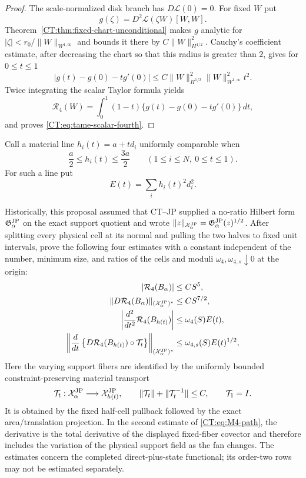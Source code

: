\begin{proof}
The scale-normalized disk branch has $D\mathcal L(0)=0$.  For fixed $W$ put
\[
 g(\zeta)=D^2\mathcal L(\zeta W)[W,W].
\]
Theorem~\ref{CT:thm:fixed-chart-unconditional} makes $g$ analytic for
$|\zeta|<r_0/\|W\|_{W^{1,\infty}}$ and bounds it there by
$C\|W\|_{H^{1/2}}^2$.  Cauchy's coefficient estimate, after decreasing the
chart so that this radius is greater than $2$, gives for $0\le t\le1$
\[
 |g(t)-g(0)-tg'(0)|
 \le C\|W\|_{H^{1/2}}^2\|W\|_{W^{1,\infty}}^2t^2.
\]
Twice integrating the scalar Taylor formula yields
\[
 \mathcal R_4(W)
 =\int_0^1(1-t)\{g(t)-g(0)-tg'(0)\}\,dt,
\]
and proves \eqref{CT:eq:tame-scalar-fourth}.
\end{proof}

Call a material line $h_i(t)=a+td_i$ uniformly comparable when
\begin{equation}\label{CT:eq:uniformly-comparable}
 \frac a2\le h_i(t)\le\frac{3a}{2}
 \qquad(1\le i\le N,\ 0\le t\le1).
\end{equation}
For such a line put
\[
 E(t)=\sum_i h_i(t)^2d_i^2.
\]

\begin{remark}
\label{CT:obl:material-fourth}
Historically, this proposal assumed that CT--JP supplied a no-ratio Hilbert
form $\mathfrak G^{\rm JP}_\alpha$ on the exact support quotient and wrote
$\|z\|_{\mathcal X^{\rm JP}_\alpha}=\mathfrak G^{\rm JP}_\alpha(z)^{1/2}$.  After splitting every physical
cell at its normal and pulling the two halves to fixed unit intervals,
prove the following four estimates with a constant independent of the
number, minimum size, and ratios of the cells and moduli
$\omega_4,\omega_{4,s}\downarrow0$ at the origin:
\begin{align}
 |\mathcal R_4(B_\alpha)|&\le CS^5,\notag\\
 \|D\mathcal R_4(B_\alpha)\|_{(\mathcal X^{\rm JP}_\alpha)^*}&\le CS^{7/2},
 \label{CT:eq:M4-size}\\
 \left|\frac{d^2}{dt^2}\mathcal R_4(B_{h(t)})\right|
 &\le \omega_4(S) E(t),\notag\\
 \left\|\frac d{dt}\left\{D\mathcal R_4(B_{h(t)})
     \circ\mathcal T_t\right\}\right\|_{(\mathcal X^{\rm JP}_\alpha)^*}
 &\le \omega_{4,s}(S)E(t)^{1/2},
 \label{CT:eq:M4-path}
\end{align}
Here the varying support fibers are identified by the uniformly bounded
constraint-preserving material transport
\[
 \mathcal T_t:\mathcal X^{\rm JP}_\alpha\longrightarrow\mathcal X^{\rm JP}_{h(t)},
 \qquad
 \|\mathcal T_t\|+\|\mathcal T_t^{-1}\|\le C,
 \qquad \mathcal T_1=I.
\]
It is obtained by the fixed half-cell pullback followed by the exact
area/translation projection.  In the second estimate of
\eqref{CT:eq:M4-path}, the derivative is the total derivative of the displayed
fixed-fiber covector and therefore includes the variation of the physical
support field as the fan changes.  The estimates concern the completed direct-plus-state
functional; its order-two rows may not be estimated separately.
\end{remark}

